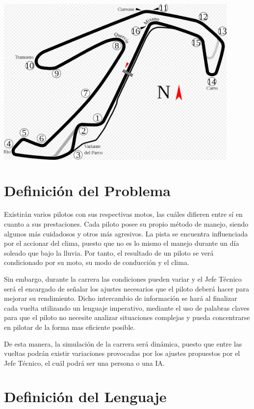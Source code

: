 \documentclass[12pt, letterpaper,spanish]{article}
\theoremstyle{definition}
\theoremstyle{remark}
\begin{document}
	\begin{center}
		\includegraphics[width = 12cm]{circuito} 
	\end{center}
	
\section{Definición del Problema}
	Existirán varios pilotos con sus respectivas motos, las cuáles difieren entre sí en cuanto a sus prestaciones. Cada piloto posee su propio método de manejo, siendo algunos más cuidadosos y otros más agresivos. La pista se encuentra influenciada por el accionar del clima, puesto que no es lo mismo el manejo durante un día soleado que bajo la lluvia. Por tanto, el resultado de un piloto se verá condicionado por su moto, su modo de conducción y el clima.\par
	Sin embargo, durante la carrera las condiciones pueden variar y el Jefe Técnico será el encargado de señalar los ajustes necesarios que el piloto deberá hacer para mejorar su rendimiento. Dicho intercambio de información se hará al finalizar cada vuelta utilizando un lenguaje imperativo, mediante el uso de palabras claves para que el piloto no necesite analizar situaciones complejas y pueda concentrarse en pilotar de la forma mas eficiente posible.\par
	De esta manera, la simulación de la carrera será dinámica, puesto que entre las vueltas podrán existir variaciones provocadas por los ajustes propuestos por el Jefe Técnico, el cuál podrá ser una persona o una IA.\par
	
\section{Definición del Lenguaje}
	
\end{document}
